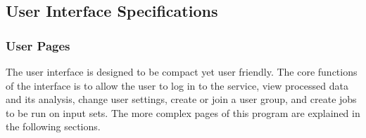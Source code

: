 \subsection{User Interface Specifications}
\subsubsection{User Pages}
The user interface is designed to be compact yet user friendly. The core functions of the interface is to allow the user to log in to the service, view processed data and its analysis, change user settings, create or join a user group, and create jobs to be run on input sets. The more complex pages of this program are explained in the following sections.








